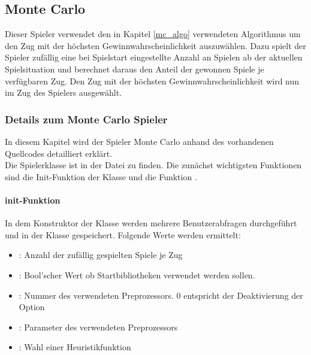 \subsection{Monte Carlo}
Dieser Spieler verwendet den in Kapitel \ref{mc_algo} verwendeten Algorithmus um den Zug mit der höchsten Gewinnwahrscheinlichkeit auszuwählen. Dazu spielt der Spieler zufällig eine bei Spielstart eingestellte Anzahl an Spielen ab der aktuellen Spielsituation und berechnet daraus den Anteil der gewonnen Spiele je verfügbaren Zug. Den Zug mit der höchsten Gewinnwahrscheinlichkeit wird nun im  Zug des Spielers ausgewählt.
\subsubsection{Details zum Monte Carlo Spieler}
In diesem Kapitel wird der Spieler Monte Carlo anhand des vorhandenen Quellcodes detailliert erklärt.
\\Die Spielerklasse  ist in der Datei  zu finden.
Die zunächst wichtigsten Funktionen sind die Init-Funktion der Klasse und die Funktion .
\paragraph{init-Funktion}
In dem Konstruktor der Klasse  werden mehrere Benutzerabfragen durchgeführt und in der Klasse gespeichert. Folgende Werte werden ermittelt:
\begin{itemize}
\item {}: Anzahl der zufällig gespielten Spiele je Zug
\item {}: Bool'scher Wert ob Startbibliotheken verwendet werden sollen.
\item {}: Nummer des verwendeten Preprozessors. 0 entspricht der Deaktivierung der Option
\item {}: Parameter des verwendeten Preprozessors
\item {}: Wahl einer Heuristikfunktion
\end{itemize}

